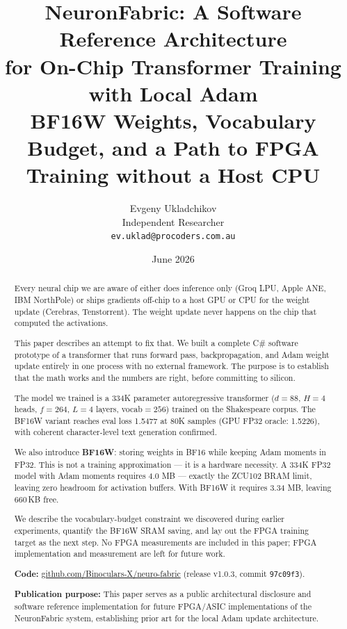 \documentclass[11pt]{article}
\title{\textbf{NeuronFabric: A Software Reference Architecture\\
for On-Chip Transformer Training with Local Adam}\\[0.5em]
\large BF16W Weights, Vocabulary Budget, and a Path to FPGA Training without a Host CPU}
\author{
  Evgeny Ukladchikov \\
  Independent Researcher \\
  \texttt{ev.uklad@procoders.com.au} \\[0.3em]
  \small \href{\repourl}{\repourltext}
}
\date{June 2026}
\newcommand{\repourl}{https://github.com/Binoculars-X/neuro-fabric}
\newcommand{\repourltext}{github.com/Binoculars-X/neuro-fabric}
\begin{document}
\maketitle

\begin{abstract}

Every neural chip we are aware of either does inference only (Groq LPU, Apple ANE,
IBM NorthPole) or ships gradients off-chip to a host GPU or CPU for the weight update
(Cerebras, Tenstorrent). The weight update never happens on the chip that computed
the activations.

This paper describes an attempt to fix that. We built a complete C\# software prototype
of a transformer that runs forward pass, backpropagation, and Adam weight update
entirely in one process with no external framework. The purpose is to establish that
the math works and the numbers are right, before committing to silicon.

The model we trained is a 334K parameter autoregressive transformer
($d{=}88$, $H{=}4$ heads, $f{=}264$, $L{=}4$ layers, vocab$=256$) trained on the
Shakespeare corpus. The BF16W variant reaches eval loss 1.5477 at 80K samples
(GPU FP32 oracle: 1.5226), with coherent character-level text generation confirmed.

We also introduce \textbf{BF16W}: storing weights in BF16 while keeping Adam moments
in FP32. This is not a training approximation --- it is a hardware necessity.
A 334K FP32 model with Adam moments requires 4.0 MB --- exactly the ZCU102 BRAM limit,
leaving zero headroom for activation buffers. With BF16W it requires 3.34 MB,
leaving 660\,KB free.

We describe the vocabulary-budget constraint we discovered during earlier experiments,
quantify the BF16W SRAM saving, and lay out the FPGA training target as the next step.
No FPGA measurements are included in this paper; FPGA implementation and measurement are left for future work.

\textbf{Code:} \href{\repourl}{\repourltext} (release v1.0.3, commit \texttt{97c09f3}).

\textbf{Publication purpose:} This paper serves as a public architectural disclosure
and software reference implementation for future FPGA/ASIC implementations of the
NeuronFabric system, establishing prior art for the local Adam update architecture.

\end{abstract}
\end{document}
